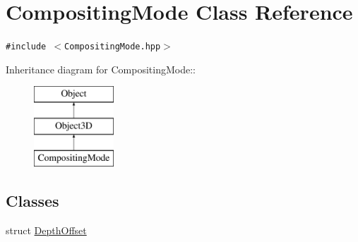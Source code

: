 \hypertarget{classm3g_1_1CompositingMode}{
\section{CompositingMode Class Reference}
\label{classm3g_1_1CompositingMode}
}
{\tt \#include $<$CompositingMode.hpp$>$}

Inheritance diagram for CompositingMode::\begin{figure}[H]
\begin{center}
\leavevmode
\includegraphics[height=3cm]{classm3g_1_1CompositingMode}
\end{center}
\end{figure}
\subsection*{Classes}
\begin{CompactItemize}
\item 
struct \hyperlink{structm3g_1_1CompositingMode_1_1DepthOffset}{DepthOffset}
\end{CompactItemize}
